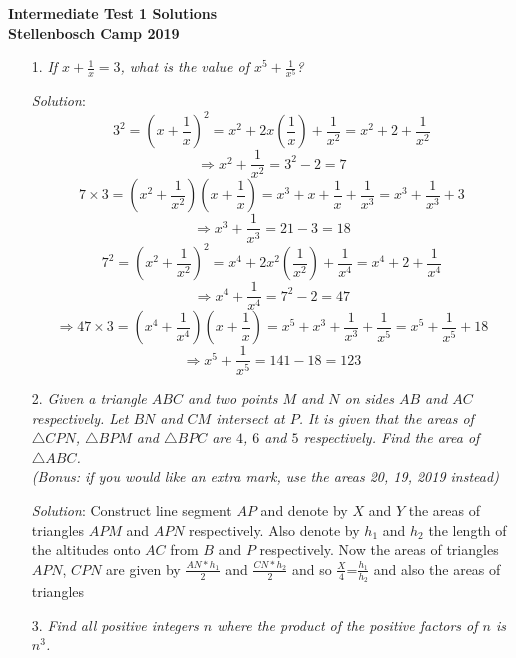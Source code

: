 \documentclass{article}
\begin{document}
\begin{center}
  \textbf{\Large Intermediate Test 1 Solutions}
  \\ \vspace{1em}
  \textbf{\large Stellenbosch Camp 2019}
\end{center}


\begin{enumerate}[1.]

\item[1.] %
\textit{If $x + \frac{1}{x} = 3$, what is the value of $x^5 + \frac{1}{x^5}$?}

\textit{Solution}: 
$$3^2 = (x + \frac{1}{x})^2 = x^2 + 2x(\frac{1}{x}) + \frac{1}{x^2} = x^2 + 2 + \frac{1}{x^2}$$
$$\Rightarrow x^2 + \frac{1}{x^2} = 3^2 - 2 = 7$$
$$7 \times 3 = (x^2 + \frac{1}{x^2})(x + \frac{1}{x}) = x^3 + x + \frac{1}{x} + \frac{1}{x^3} = x^3 + \frac{1}{x^3} + 3$$
$$\Rightarrow x^3 + \frac{1}{x^3} = 21 - 3 = 18$$
$$7^2 = (x^2 + \frac{1}{x^2})^2 = x^4 + 2x^2(\frac{1}{x^2}) + \frac{1}{x^4} = x^4 + 2 + \frac{1}{x^4}$$
$$\Rightarrow x^4 + \frac{1}{x^4} = 7^2 - 2 = 47$$
$$\Rightarrow 47 \times 3 = (x^4 + \frac{1}{x^4})(x + \frac{1}{x}) = x^5 + x^3 + \frac{1}{x^3} + \frac{1}{x^5} = x^5 + \frac{1}{x^5} + 18$$
$$\Rightarrow x^5 + \frac{1}{x^5} = 141 - 18 = 123$$

\vspace{6.81mm}

\item[2.] %
\textit{Given a triangle $ABC$ and two points $M$ and $N$ on sides $AB$ and $AC$ respectively. Let $BN$ and $CM$ intersect at $P$. It is given that the areas of $\triangle CPN$, $\triangle BPM$ and $\triangle BPC$ are $4$, $6$ and $5$ respectively.
Find the area of $\triangle ABC$.\\
(Bonus: if you would like an extra mark, use the areas 20, 19, 2019 instead)}

\textit{Solution}: Construct line segment $AP$ and denote by $X$ and $Y$ the areas of triangles $APM$ and $APN$ respectively. Also denote by $h_1$ and $h_2$ the length of the altitudes onto $AC$ from $B$ and $P$ respectively. Now the areas of triangles $APN$, $CPN$ are given by $\frac{AN*h_1}{2}$ and $\frac{CN*h_2}{2}$ and so $\frac{X}{4}$=$\frac{h_1}{h_2}$ and also the areas of triangles 

\vspace{6.81mm}

\item[3.] %
\textit{Find all positive integers $n$ where the product of the positive factors of $n$ is $n^3$.}


\end{enumerate}
\end{document}
